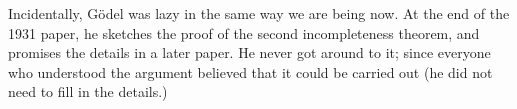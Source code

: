 \documentclass[../../include/open-logic-section]{subfiles}
\begin{document}
\begin{digress}
Incidentally, G\"odel was lazy in the same way we are
being now. At the end of the 1931 paper, he sketches the proof of the
second incompleteness theorem, and promises the details in a later
paper. He never got around to it; since everyone who understood the
argument believed that it could be carried out (he did not need to
fill in the details.)
\end{digress}
\end{document}
